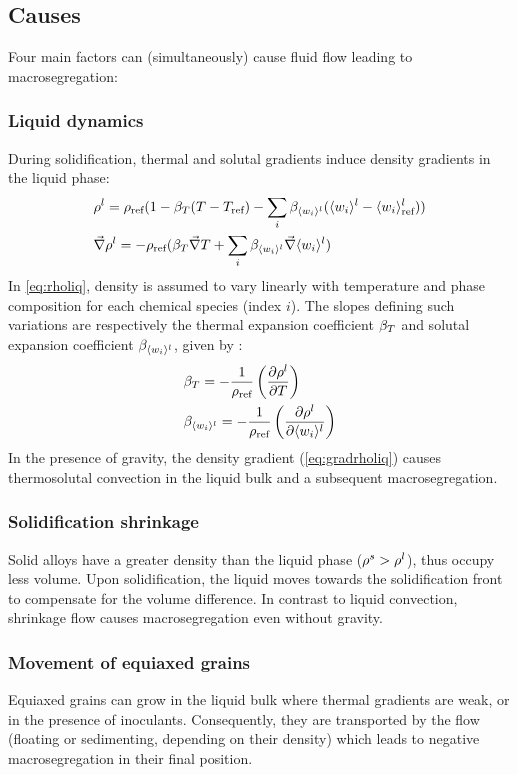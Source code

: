 \subsection{Causes}
Four main factors can (simultaneously) cause fluid flow leading to macrosegregation:
\subsubsection*{Liquid dynamics}
During solidification, thermal and solutal gradients induce density gradients in the liquid phase: 
\begin{subequations}
\begin{align}
\label{eq:rholiq}
& \rho^l = \rho_{\text{ref}} ( 1 - \beta_T (T - T_{\text{ref}}) - \sum_{i} \beta_{\langle w_i \rangle^l} (\langle w_i \rangle^l - \langle w_i \rangle_{\text{ref}}^l) )  \\ 
\label{eq:gradrholiq}
& \vec{\nabla}\rho^l = -\rho_{\text{ref}} (  \beta_T \vec{\nabla} T + \sum_{i} \beta_{\langle w_i \rangle^l} \vec{\nabla}\langle w_i \rangle^l  )
\end{align}
\end{subequations}
In \cref{eq:rholiq}, density is assumed to vary linearly with temperature and phase composition for each chemical species (index $i$).
The slopes defining such variations are respectively the thermal expansion coefficient $\beta_T$ and solutal expansion coefficient $\beta_{\langle w_i \rangle^l}$, given by \citep{kohler_peritectic_2008}:
\begin{subequations}
\begin{align}
\label{eq:betaT}
& \beta_T =  -\frac{1}{\rho_{\text{ref}}} \left( \frac{\partial\rho^l}{\partial T} \right)  \\ 
\label{eq:betawil}
& \beta_{\langle w_i \rangle^l} = -\frac{1}{\rho_{\text{ref}}} \left( \frac{\partial \rho^l}{\partial \langle w_i \rangle^l} \right)  
\end{align}
\end{subequations}
In the presence of gravity, the density gradient (\cref{eq:gradrholiq}) causes thermosolutal convection in the liquid bulk and a subsequent macrosegregation.
 
\subsubsection*{Solidification shrinkage}
Solid alloys have a greater density than the liquid phase ($\rho^s > \rho^l$), thus occupy less volume. Upon solidification, the liquid moves towards the solidification front to compensate for the volume difference. In contrast to liquid convection, shrinkage flow causes macrosegregation even without gravity.

\subsubsection*{Movement of equiaxed grains} 
Equiaxed grains can grow in the liquid bulk where thermal gradients are weak, or in the presence of inoculants. Consequently, 
they are transported by the flow (floating or sedimenting, depending on their density) which leads to negative macrosegregation in their final position.

